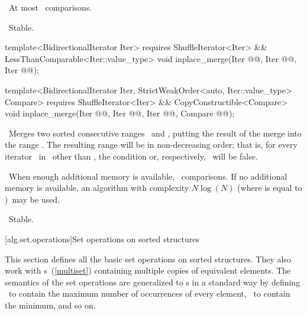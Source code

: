 \documentclass[american,twoside]{book}
\begin{document}
\begin{paras}
\begin{itemdescr}
\pnum
\complexity\ 
At most
\
comparisons.

\pnum
\notes\ 
Stable.
\end{itemdescr}

%
\color{addclr}\begin{itemdecl}
template<BidirectionalIterator Iter>
  requires ShuffleIterator<Iter> 
        && LessThanComparable<Iter::value_type>
  void inplace_merge(Iter @@,
                     Iter @@,
                     Iter @\farg{last}@);

template<BidirectionalIterator Iter, 
         StrictWeakOrder<auto, Iter::value_type> Compare>
  requires ShuffleIterator<Iter>
        && CopyConstructible<Compare>
  void inplace_merge(Iter @\farg{first}@,
                     Iter @@,
                     Iter @\farg{last}@, Compare @@);
\end{itemdecl}\color{black}

\begin{itemdescr}
\pnum
\effects\ 
Merges two sorted consecutive ranges
\
and
,
putting the result of the merge into the range
.
The resulting range will be in non-decreasing order;
that is, for every iterator
\tcode{i}\
in
\range{\farg{first}}{\farg{last}}\
other than
\tcode{\farg{first}},
the condition
\tcode{*i < *(i - 1)}
or, respectively,
\
will be false.

\pnum
{}

\pnum
\complexity\ 
When enough additional memory is available,
\
comparisons.
If no additional memory is available, an algorithm with complexity
$N \log(N)$
(where
\tcode{N}
is equal to
)\
may be used.

\pnum
\notes\ 
Stable.
\end{itemdescr}

\rSec2[alg.set.operations]{Set operations on sorted structures}

\pnum
This section defines all the basic set operations on sorted structures.
They also work with
s~(\ref{multiset})
containing multiple copies of equivalent elements.
The semantics of the set operations are generalized to
s
in a standard way by defining
\
to contain the maximum number of occurrences of every element,
\
to contain the minimum, and so on.


\end{paras}
\end{document}
